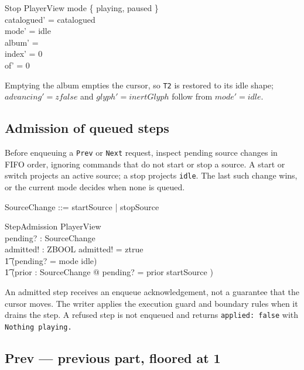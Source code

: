 \documentclass[a4paper,10pt,fleqn]{article}
\begin{document}
\begin{schema}{Stop}
  \Delta PlayerView
  \where
  mode \in \{ playing, paused \} \\
  catalogued' = catalogued \\
  mode' = idle \\
  album' = \emptyset \\
  index' = 0 \\
  of' = 0
\end{schema}

Emptying the album empties the cursor, so \texttt{T2} is restored to its idle
shape; $advancing' = zfalse$ and $glyph' = inertGlyph$ follow from $mode' =
idle$.

\subsection{Admission of queued steps}
\label{sec:stepadmission}

Before enqueuing a \texttt{Prev} or \texttt{Next} request, inspect pending
source changes in FIFO order, ignoring commands that do not start or stop a
source. A start or switch projects an active source; a stop projects
\texttt{idle}. The last such change wins, or the current mode decides when
none is queued.

\begin{zed}
  SourceChange ::= startSource | stopSource
\end{zed}

\begin{schema}{StepAdmission}
  \Xi PlayerView \\
  pending? : \seq SourceChange \\
  admitted! : ZBOOL
  \where
  admitted! = ztrue \iff \\
  \t1 (pending? = \langle \rangle \land mode \neq idle) \lor \\
  \t1 (\exists prior : \seq SourceChange @
  pending? = prior \cat \langle startSource \rangle)
\end{schema}

An admitted step receives an enqueue acknowledgement, not a guarantee that
the cursor moves. The writer applies the execution guard and boundary rules
when it drains the step. A refused step is not enqueued and returns
\texttt{applied: false} with \texttt{Nothing playing.}

\subsection{Prev --- previous part, floored at 1}
\label{sec:prev}
\end{document}
